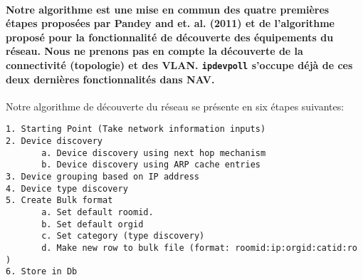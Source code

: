 \paragraph{Notre algorithme est une mise en commun des quatre premières étapes proposées par Pandey and et. al. (2011) et de l'algorithme proposé pour la fonctionnalité de découverte des équipements du réseau. Nous ne prenons pas en compte la découverte de la connectivité (topologie)  et des VLAN. \texttt{ipdevpoll} s'occupe déjà de ces deux dernières fonctionnalités dans NAV. \\}

Notre algorithme de découverte du réseau se présente en six étapes suivantes:
\begin{verbatim}
1. Starting Point (Take network information inputs)
2. Device discovery
       a. Device discovery using next hop mechanism
       b. Device discovery using ARP cache entries
3. Device grouping based on IP address
4. Device type discovery
5. Create Bulk format
	   a. Set default roomid.
	   b. Set default orgid
	   c. Set category (type discovery)
	   d. Make new row to bulk file (format: roomid:ip:orgid:catid:ro )
6. Store in Db
\end{verbatim}



